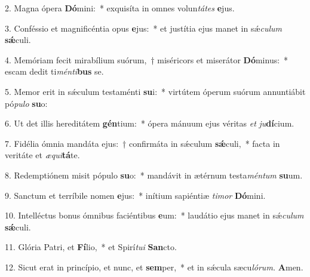 \item 2. Magna ópera \textbf{Dó}mini:~* exquisíta in omnes volun\textit{tátes} \textbf{e}jus.
\item 3. Conféssio et magnificéntia opus \textbf{e}jus:~* et justítia ejus manet in sǽ\textit{culum} \textbf{sǽ}culi.
\item 4. Memóriam fecit mirabílium suórum,~† miséricors et miserátor \textbf{Dó}minus:~* escam dedit ti\textit{ménti}\textbf{bus} se.
\item 5. Memor erit in sǽculum testaménti \textbf{su}i:~* virtútem óperum suórum annuntiábit pó\textit{pulo} \textbf{su}o:
\item 6. Ut det illis hereditátem \textbf{gén}tium:~* ópera mánuum ejus véritas \textit{et} \textit{ju}\textbf{dí}cium.
\item 7. Fidélia ómnia mandáta ejus:~† confirmáta in sǽculum \textbf{sǽ}culi,~* facta in veritáte et \textit{æqui}\textbf{tá}te.
\item 8. Redemptiónem misit pópulo \textbf{su}o:~* mandávit in ætérnum testa\textit{méntum} \textbf{su}um.
\item 9. Sanctum et terríbile nomen \textbf{e}jus:~* inítium sapiéntiæ \textit{timor} \textbf{Dó}mini.
\item 10. Intelléctus bonus ómnibus faciéntibus \textbf{e}um:~* laudátio ejus manet in sǽ\textit{culum} \textbf{sǽ}culi.
\item 11. Glória Patri, et \textbf{Fí}lio,~* et Spirí\hspace{0.03em}\textit{tui} \textbf{San}cto.
\item 12. Sicut erat in princípio, et nunc, et \textbf{sem}per,~* et in sǽcula sæcu\hspace{0.03em}\textit{lórum.} \textbf{A}men.